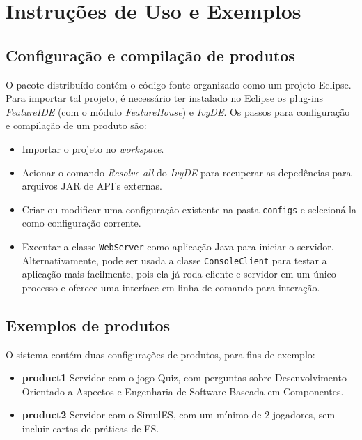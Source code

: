 \documentclass[12pt]{article}
\begin{document}
\section{Instruções de Uso e Exemplos}
\label{sec:examples}

\subsection{Configuração e compilação de produtos}

O pacote distribuído contém o código fonte organizado como um projeto Eclipse. Para importar tal projeto, é necessário ter instalado no Eclipse os plug-ins \emph{FeatureIDE} (com o módulo \emph{FeatureHouse}) e \emph{IvyDE}. Os passos para configuração e compilação de um produto são:
\begin{itemize}
\item Importar o projeto no \emph{workspace}.
\item Acionar o comando \emph{Resolve all} do \emph{IvyDE} para recuperar as depedências para arquivos JAR de API's externas.
\item Criar ou modificar uma configuração existente na pasta \texttt{configs} e selecioná-la como configuração corrente.
\item Executar a classe \texttt{WebServer} como aplicação Java para iniciar o servidor. Alternativamente, pode ser usada a classe \texttt{ConsoleClient} para testar a aplicação mais facilmente, pois ela já roda cliente e servidor em um único processo e oferece uma interface em linha de comando para interação.
\end{itemize}

\subsection{Exemplos de produtos}

O sistema contém duas configurações de produtos, para fins de exemplo:
\begin{itemize}
\item \textbf{product1} Servidor com o jogo Quiz, com perguntas sobre Desenvolvimento Orientado a Aspectos e Engenharia de Software Baseada em Componentes.
\item \textbf{product2} Servidor com o SimulES, com um mínimo de 2 jogadores, sem incluir cartas de práticas de ES.
\end{itemize}

\FloatBarrier


\end{document}
